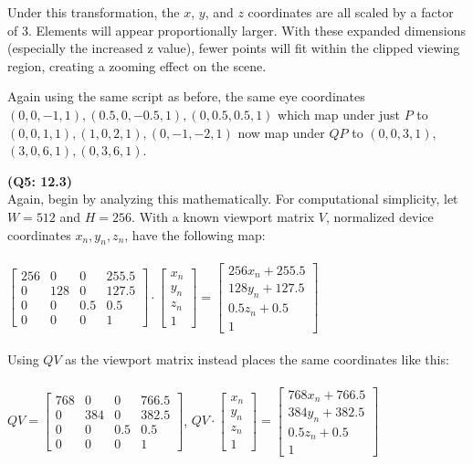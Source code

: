 \documentclass[letterpaper, 11pt]{article}
\begin{document}
Under this transformation, the $x$, $y$, and $z$ coordinates are all scaled by a factor of $3$. Elements will appear proportionally larger. With these expanded dimensions (especially the increased z value), fewer points will fit within the clipped viewing region, creating a zooming effect on the scene.

\medskip
Again using the same script as before, the same eye coordinates $(0, 0,-1, 1), (0.5, 0, -0.5, 1), (0, 0.5, 0.5, 1)$ which map under just $P$ to $(0, 0, 1, 1), (1, 0, 2, 1), (0, -1, -2, 1)$ now map under $QP$ to $(0, 0, 3, 1)$, $(3, 0, 6, 1), (0, 3, 6, 1)$. 


\medskip
\textbf{(Q5: 12.3)} \\ 
Again, begin by analyzing this mathematically. For computational simplicity, let $W = 512$ and $H = 256$. With a known viewport matrix $V$, normalized device coordinates $x_n, y_n, z_n$, have the following map: \\ \\ 
$\begin{bmatrix}
  256 & 0 & 0 & 255.5 \\ 
  0 & 128 & 0 & 127.5 \\ 
  0 & 0 & 0.5 & 0.5 \\ 
  0 & 0 & 0 & 1 
\end{bmatrix}
\cdot 
\begin{bmatrix}
  x_n \\ 
  y_n \\ 
  z_n \\
  1 
\end{bmatrix}
=
\begin{bmatrix}
  256x_n + 255.5 \\
  128y_n + 127.5 \\ 
  0.5z_n + 0.5 \\ 
  1
\end{bmatrix}$ \\ \\ 

Using $QV$ as the viewport matrix instead places the same coordinates like this: \\ \\ 
$QV = \begin{bmatrix}
  768 & 0 & 0 & 766.5 \\ 
  0 & 384 & 0 & 382.5 \\  
  0 & 0 & 0.5 & 0.5 \\ 
  0 & 0 & 0 & 1 
\end{bmatrix}$, 
$QV \cdot
\begin{bmatrix}
  x_n \\ 
  y_n \\ 
  z_n \\ 
  1
\end{bmatrix} = 
\begin{bmatrix}
  768x_n + 766.5 \\ 
  384y_n + 382.5 \\ 
  0.5z_n + 0.5 \\ 
  1
\end{bmatrix}$ \\ \\ 
\end{document}
